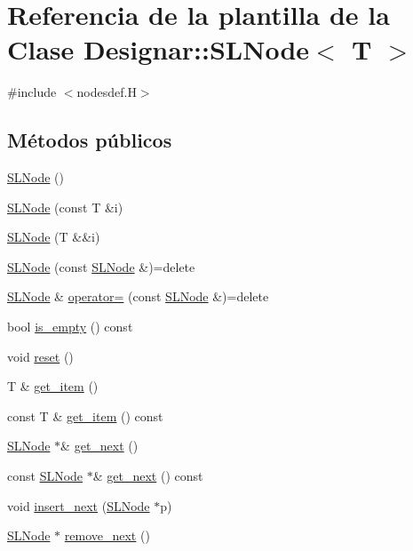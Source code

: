 \hypertarget{class_designar_1_1_s_l_node}{}\section{Referencia de la plantilla de la Clase Designar\+:\+:S\+L\+Node$<$ T $>$}
\label{class_designar_1_1_s_l_node}


{\ttfamily \#include $<$nodesdef.\+H$>$}

\subsection*{Métodos públicos}
\begin{DoxyCompactItemize}
\item 
\hyperlink{class_designar_1_1_s_l_node_ae069c6940aaa2a34a513852f1c3bf3d3}{S\+L\+Node} ()
\item 
\hyperlink{class_designar_1_1_s_l_node_af9decf3a4e3809e98d0e9652295c9c1a}{S\+L\+Node} (const T \&i)
\item 
\hyperlink{class_designar_1_1_s_l_node_ab854d173d39d41bacee31e9c8f0862bf}{S\+L\+Node} (T \&\&i)
\item 
\hyperlink{class_designar_1_1_s_l_node_a29b970c1369f20fe8c783b66fb8490c1}{S\+L\+Node} (const \hyperlink{class_designar_1_1_s_l_node}{S\+L\+Node} \&)=delete
\item 
\hyperlink{class_designar_1_1_s_l_node}{S\+L\+Node} \& \hyperlink{class_designar_1_1_s_l_node_a0f721b1dd909cf847079ad14ca010bd0}{operator=} (const \hyperlink{class_designar_1_1_s_l_node}{S\+L\+Node} \&)=delete
\item 
bool \hyperlink{class_designar_1_1_s_l_node_a80728e8c780ed3854fa1b9fb84c201cc}{is\+\_\+empty} () const
\item 
void \hyperlink{class_designar_1_1_s_l_node_ad837fcbb2d5d1fb1c7aa51392f6fdaae}{reset} ()
\item 
T \& \hyperlink{class_designar_1_1_s_l_node_a8b1b374efe3c861930b24515fb15d243}{get\+\_\+item} ()
\item 
const T \& \hyperlink{class_designar_1_1_s_l_node_a3bda4e61a77ff2df2096850759605257}{get\+\_\+item} () const
\item 
\hyperlink{class_designar_1_1_s_l_node}{S\+L\+Node} $\ast$\& \hyperlink{class_designar_1_1_s_l_node_ab1b0be79e766dddc4a09d9ef9f2c5763}{get\+\_\+next} ()
\item 
const \hyperlink{class_designar_1_1_s_l_node}{S\+L\+Node} $\ast$\& \hyperlink{class_designar_1_1_s_l_node_af5e1695860968505290e42d16381508f}{get\+\_\+next} () const
\item 
void \hyperlink{class_designar_1_1_s_l_node_aa1c82417ecc20fca0808c955bca384f7}{insert\+\_\+next} (\hyperlink{class_designar_1_1_s_l_node}{S\+L\+Node} $\ast$p)
\item 
\hyperlink{class_designar_1_1_s_l_node}{S\+L\+Node} $\ast$ \hyperlink{class_designar_1_1_s_l_node_aa12ebd41228f87e9df06d5e74b7111e6}{remove\+\_\+next} ()
\end{DoxyCompactItemize}



